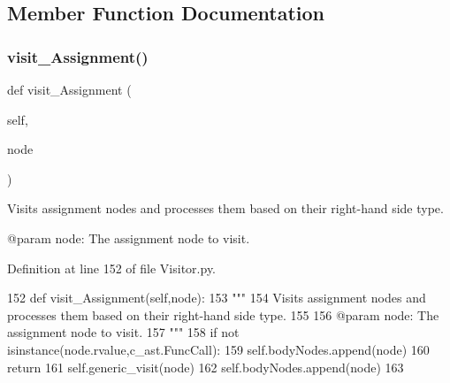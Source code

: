 \subsection{Member Function Documentation}
\mbox{\label{classPostProcessor_1_1Visitor_1_1BinaryOpInRegHandler_adae6ad6f5b94c4acd95924bb3df9ebc8}} 
\subsubsection{\texorpdfstring{visit\+\_\+\+Assignment()}{visit\_Assignment()}}
{\footnotesize\ttfamily def visit\+\_\+\+Assignment (\begin{DoxyParamCaption}\item[{}]{self,  }\item[{}]{node }\end{DoxyParamCaption})}

\begin{DoxyVerb}Visits assignment nodes and processes them based on their right-hand side type.

@param node: The assignment node to visit.
\end{DoxyVerb}
 

Definition at line 152 of file Visitor.\+py.


\begin{DoxyCode}
152     \textcolor{keyword}{def }visit\_Assignment(self,node):
153         \textcolor{stringliteral}{"""
}
154 \textcolor{stringliteral}{        Visits assignment nodes and processes them based on their right-hand side type.
}
155 \textcolor{stringliteral}{
}
156 \textcolor{stringliteral}{        @param node: The assignment node to visit.
}
157 \textcolor{stringliteral}{        """}
158         \textcolor{keywordflow}{if} \textcolor{keywordflow}{not} isinstance(node.rvalue,c\_ast.FuncCall):
159             self.bodyNodes.append(node)
160             \textcolor{keywordflow}{return}
161         self.generic\_visit(node)
162         self.bodyNodes.append(node)
163     
\end{DoxyCode}
\mbox{\label{classPostProcessor_1_1Visitor_1_1BinaryOpInRegHandler_a6568bead87923bbcaa593e5f226920f0}} 
